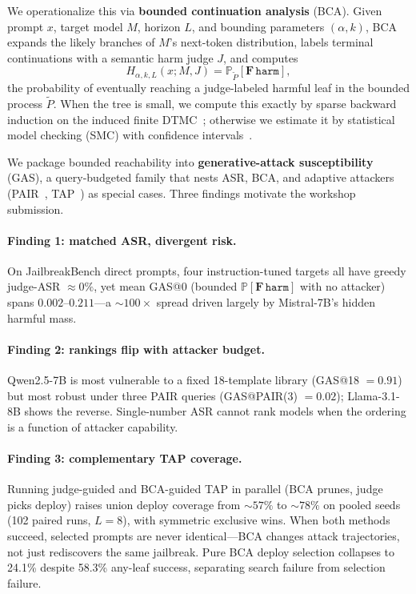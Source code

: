 \documentclass{article}
\newcommand{\Prob}{\mathbb{P}}
\newcommand{\harm}{\texttt{harm}}
\newcommand{\BCA}{\textsc{BCA}}
\newcommand{\ASR}{\textsc{ASR}}
\newcommand{\GAS}{\textsc{GAS}}
\newcommand{\DTMC}{\textsc{DTMC}}
\newcommand{\SMC}{\textsc{SMC}}
\begin{document}
We operationalize this via \textbf{bounded continuation analysis} (\BCA).
Given prompt $x$, target model $M$, horizon $L$, and bounding parameters $(\alpha,k)$, \BCA{} expands the likely branches of $M$'s next-token distribution, labels terminal continuations with a semantic harm judge $J$, and computes
\[
  H_{\alpha,k,L}(x;M,J) = \Prob_{\widetilde P}[\mathbf{F}\,\harm],
\]
the probability of eventually reaching a judge-labeled harmful leaf in the bounded process $\widetilde P$.
When the tree is small, we compute this exactly by sparse backward induction on the induced finite \DTMC{}~\citep{gross2025llmchecker,baier2008principles}; otherwise we estimate it by statistical model checking (\SMC) with confidence intervals~\citep{younes2002probabilistic,hoeffding1963}.

We package bounded reachability into \textbf{generative-attack susceptibility} (\GAS), a query-budgeted family that nests \ASR{}, \BCA{}, and adaptive attackers (PAIR~\citep{chao2023pair}, \textsc{TAP}~\citep{mehrotra2024tap}) as special cases.
Three findings motivate the workshop submission.

\paragraph{Finding 1: matched \ASR{}, divergent risk.}
On JailbreakBench direct prompts, four instruction-tuned targets all have greedy judge-\ASR{} $\approx 0\%$, yet mean \GAS{}@0 (bounded $\Prob[\mathbf{F}\,\harm]$ with no attacker) spans $\mathbf{0.002}$--$\mathbf{0.211}$---a ${\sim}100\times$ spread driven largely by Mistral-7B's hidden harmful mass.

\paragraph{Finding 2: rankings flip with attacker budget.}
Qwen2.5-7B is most vulnerable to a fixed 18-template library (\GAS{}@18 $=0.91$) but most robust under three PAIR queries (\GAS{}@PAIR(3) $=0.02$); Llama-3.1-8B shows the reverse.
Single-number \ASR{} cannot rank models when the ordering is a function of attacker capability.

\paragraph{Finding 3: complementary \textsc{TAP} coverage.}
Running judge-guided and \BCA{}-guided \textsc{TAP} in parallel (BCA prunes, judge picks deploy) raises union deploy coverage from ${\sim}57\%$ to ${\sim}78\%$ on pooled seeds (102 paired runs, $L{=}8$), with symmetric exclusive wins.
When both methods succeed, selected prompts are never identical---\BCA{} changes attack trajectories, not just rediscovers the same jailbreak.
Pure \BCA{} deploy selection collapses to 24.1\% despite 58.3\% any-leaf success, separating search failure from selection failure.
\end{document}
